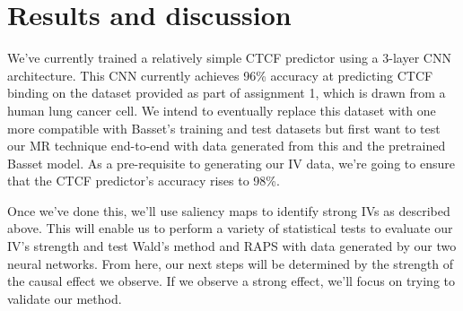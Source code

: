\documentclass{article}
\begin{document}
\section{Results and discussion}
We've currently trained a relatively simple CTCF predictor using a 3-layer CNN architecture. This CNN currently achieves 96\% accuracy at predicting CTCF binding on the dataset provided as part of assignment 1, which is drawn from a human lung cancer cell. We intend to eventually replace this dataset with one more compatible with Basset's training and test datasets but first want to test our MR technique end-to-end with data generated from this and the pretrained Basset model. As a pre-requisite to generating our IV data, we're going to ensure that the CTCF predictor's accuracy rises to 98\%.

Once we've done this, we'll use saliency maps to identify strong IVs as described above. This will enable us to perform a variety of statistical tests to evaluate our IV's strength and test Wald's method and RAPS with data generated by our two neural networks. From here, our next steps will be determined by the strength of the causal effect we observe. If we observe a strong effect, we'll focus on trying to validate our method.


\end{document}
